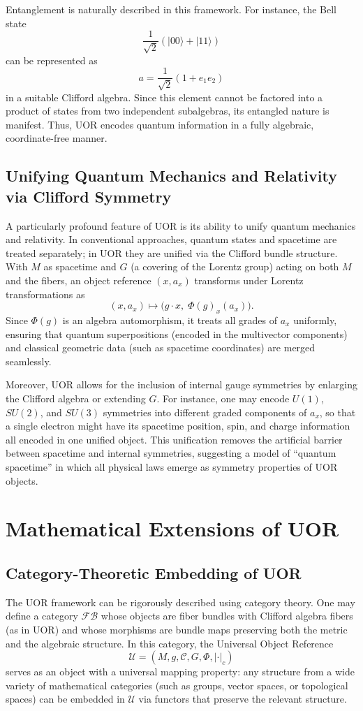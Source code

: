 \documentclass[12pt]{article}
\begin{document}
Entanglement is naturally described in this framework. For instance, the Bell state 
\[
\frac{1}{\sqrt{2}} \left( |00\rangle + |11\rangle \right)
\]
can be represented as 
\[
a = \frac{1}{\sqrt{2}} (1 + e_1e_2)
\]
in a suitable Clifford algebra. Since this element cannot be factored into a product of states from two independent subalgebras, its entangled nature is manifest. Thus, UOR encodes quantum information in a fully algebraic, coordinate-free manner.

\subsection{Unifying Quantum Mechanics and Relativity via Clifford Symmetry}
A particularly profound feature of UOR is its ability to unify quantum mechanics and relativity. In conventional approaches, quantum states and spacetime are treated separately; in UOR they are unified via the Clifford bundle structure. With $M$ as spacetime and $G$ (a covering of the Lorentz group) acting on both $M$ and the fibers, an object reference $(x,a_x)$ transforms under Lorentz transformations as
\[
(x,a_x) \mapsto \bigl( g\cdot x,\; \Phi(g)_x(a_x) \bigr).
\]
Since $\Phi(g)$ is an algebra automorphism, it treats all grades of $a_x$ uniformly, ensuring that quantum superpositions (encoded in the multivector components) and classical geometric data (such as spacetime coordinates) are merged seamlessly.

Moreover, UOR allows for the inclusion of internal gauge symmetries by enlarging the Clifford algebra or extending $G$. For instance, one may encode $U(1)$, $SU(2)$, and $SU(3)$ symmetries into different graded components of $a_x$, so that a single electron might have its spacetime position, spin, and charge information all encoded in one unified object. This unification removes the artificial barrier between spacetime and internal symmetries, suggesting a model of ``quantum spacetime'' in which all physical laws emerge as symmetry properties of UOR objects.

\section{Mathematical Extensions of UOR}

\subsection{Category-Theoretic Embedding of UOR}
The UOR framework can be rigorously described using category theory. One may define a category $\mathcal{FB}$ whose objects are fiber bundles with Clifford algebra fibers (as in UOR) and whose morphisms are bundle maps preserving both the metric and the algebraic structure. In this category, the Universal Object Reference 
\[
\mathcal{U}=(M,g,\mathcal{C},G,\Phi,|\cdot|_c)
\]
serves as an object with a universal mapping property: any structure from a wide variety of mathematical categories (such as groups, vector spaces, or topological spaces) can be embedded in $\mathcal{U}$ via functors that preserve the relevant structure.
\end{document}
